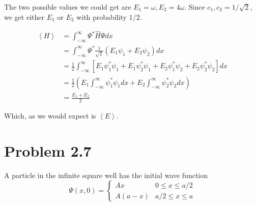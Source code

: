 \documentclass{article}
\newcommand{\bracket}[1]{\left[ #1 \right]}
\newcommand{\paren}[1]{\left( #1 \right)}
\newcommand{\braket}[1]{\left\langle #1 \right\rangle}
\newcommand{\intinf}{\int_{-\infty}^\infty}
\newenvironment{problem}{\begin{enumerate}[label=(\alph*)]}{\end{enumerate}}
\begin{document}
\begin{problem}
    The two possible values we could get are $E_1 = \omega, E_2 = 4 \omega$. 
    Since $c_1, c_2 = 1/\sqrt{2}$, we get either $E_1$ or $E_2$ with probability $1/2$.

    \begin{align*}
      \braket{H} &= \intinf \Psi^* \hat{H} \Psi dx \\
                 &= \intinf \Psi^* \frac{1}{\sqrt{2}}\paren{E_1 \psi_1 + E_2 \psi_2} dx \\
                 &= \frac{1}{2} \intinf \bracket{E_1 \psi_1^* \psi_1 + E_1 \psi_2^* \psi_1 + E_2 \psi_1^* \psi_2 + E_2 \psi_2^* \psi_2}dx \\
                 &= \frac{1}{2} \paren{E_1\intinf \psi_1^* \psi_1 dx + E_2 \intinf \psi_2^* \psi_2 dx} \\
                 &= \frac{E_1 + E_2}{2}
    \end{align*}

    Which, as we would expect is $\braket{E}$.

\end{problem}

\section*{Problem 2.7}

A particle in the infinite square well has the initial wave function 
$$\Psi(x, 0) = \begin{cases}
  Ax & 0 \leq x \leq a/2 \\
  A(a-x) & a/2 \leq x \leq a 
\end{cases}$$
\end{document}
